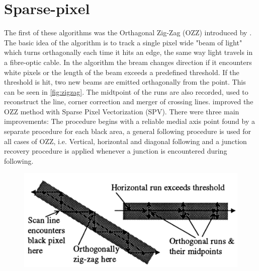 \section{Sparse-pixel}
The first of these algorithms was the Orthagonal Zig-Zag (OZZ) introduced by \citeauthor{Dori1997}. The basic idea of the algorithm is to track a single pixel wide "beam of light" which turns orthagonally each time it hits an edge, the same way light travels in a fibre-optic cable. In the algorithm the bream changes direction if it encounters white pixels or the length of the beam exceeds a predefined threshold. If the threshold is hit, two new beams are emitted orthagonally from the point. This can be seen in \autoref{fig:zigzag}. The midtpoint of the runs are also recorded, used to reconstruct the line, corner correction and merger of crossing lines. \citeauthor{Wenyin1996} improved the OZZ method with Sparse Pixel Vectorization (SPV). There were three main improvements: The procedure begins with a reliable medial axis point found by a separate procedure for each black area, a general following procedure is used for all cases of OZZ, i.e. Vertical, horizontal and diagonal following and a junction recovery procedure is applied whenever a junction is encountered during following.

\begin{figure}[H]
	\centering
	\includegraphics[width=0.8\linewidth]{fig/zigzag.png}
	\label{fig:zigzag}
\end{figure}